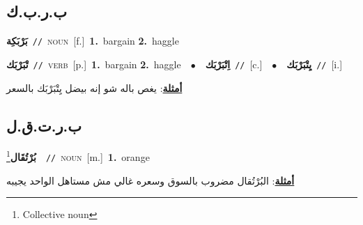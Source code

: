 \documentclass[10pt,a4paper,twoside]{article} %
\begin{document}
\begin{multicols}{2}
\vspace{-3mm}
\subsection*{\color{blue}\foreignlanguage{arabic}{ب.ر.ب.ك}\color{blue}{}} 

{\setlength\topsep{0pt}\textbf{\foreignlanguage{arabic}{بَرْبَكِة}}\ {\color{gray}\texttt{//}\color{black}}\ \textsc{noun}\ [f.]\ \textbf{1.}~bargain  \textbf{2.}~haggle\ } \vspace{2mm}

{\setlength\topsep{0pt}\textbf{\foreignlanguage{arabic}{تْبَرْبَك}}\ {\color{gray}\texttt{//}\color{black}}\ \textsc{verb}\ [p.]\ \textbf{1.}~bargain  \textbf{2.}~haggle\ \ $\bullet$\ \ \setlength\topsep{0pt}\textbf{\foreignlanguage{arabic}{اِتْبَرْبَك}}\ {\color{gray}\texttt{//}\color{black}}\ [c.]\ \ $\bullet$\ \ \setlength\topsep{0pt}\textbf{\foreignlanguage{arabic}{يِتْبَرْبَك}}\ {\color{gray}\texttt{//}\color{black}}\ [i.]\  \begin{flushright}\color{gray}\foreignlanguage{arabic}{\textbf{\underline{\foreignlanguage{arabic}{أمثلة}}}: يغص باله شو إنه بيضل يِتْبَرْبَك بالسعر}\end{flushright}\color{black}} \vspace{2mm}

\vspace{-3mm}
\subsection*{\color{blue}\foreignlanguage{arabic}{ب.ر.ت.ق.ل}\color{blue}{ (ntws)}} 

{\setlength\topsep{0pt}\textbf{\foreignlanguage{arabic}{بُرْتُقَال}}\footnote{Collective noun}\ \ {\color{gray}\texttt{//}\color{black}}\ \textsc{noun}\ [m.]\ \textbf{1.}~orange\  \begin{flushright}\color{gray}\foreignlanguage{arabic}{\textbf{\underline{\foreignlanguage{arabic}{أمثلة}}}: البُرْتُقال مضروب بالسوق وسعره غالي مش مستاهل الواحد يجيبه}\end{flushright}\color{black}} \vspace{2mm}


\end{multicols}
\end{document}

